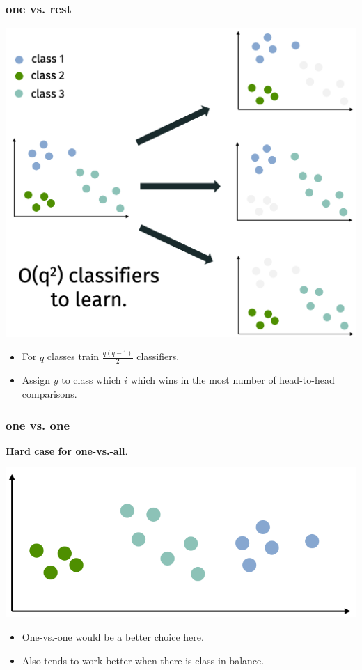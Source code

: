 \documentclass[handout,compress]{beamer}
\begin{document}
\begin{frame}
	\frametitle{one vs. rest}
	\small
	\begin{center}
		\includegraphics[width=.6\textwidth]{one_vs_one.png}
	\end{center}
	\vspace{-1em}
	\begin{itemize}
		\item For $q$ classes train $\frac{q(q-1)}{2}$ classifiers. 
		\item Assign $y$ to class which $i$ which wins in the most number of head-to-head comparisons. 
	\end{itemize}
\end{frame}

\begin{frame}
	\frametitle{one vs. one}
	\textbf{Hard case for one-vs.-all}.
	\begin{center}
		\includegraphics[width=.5\textwidth]{one_vs_hard.png}
	\end{center}
	\begin{itemize}
		\item One-vs.-one would be a better choice here. 
		\item Also tends to work better when there is class in balance.
	\end{itemize}
\end{frame}
\end{document}
